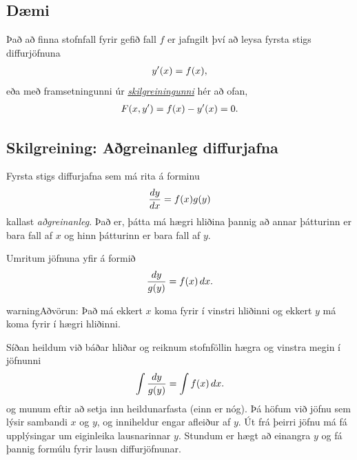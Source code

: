 \documentclass[a4paper,10pt,icelandic]{sphinxmanual}
\begin{document}
\subsection{Dæmi}
\label{kafli08:daemi}
Það að finna stofnfall fyrir gefið fall \(f\) er jafngilt því að leysa
fyrsta stigs diffurjöfnuna
\begin{gather}
\begin{split}y'(x) = f(x),\end{split}\notag
\end{gather}
eða með framsetningunni úr {\hyperref[kafli08:diffurjafna]{\emph{skilgreiningunni}}} hér
að ofan,
\begin{gather}
\begin{split}F(x,y') = f(x) - y'(x) = 0.\end{split}\notag
\end{gather}

\subsection{Skilgreining: Aðgreinanleg diffurjafna}
\label{kafli08:index-1}\label{kafli08:skilgreining-agreinanleg-diffurjafna}
Fyrsta stigs diffurjafna sem má rita á forminu
\begin{gather}
\begin{split}\frac{dy}{dx}=f(x)g(y)\end{split}\notag
\end{gather}
kallast \emph{aðgreinanleg}. Það er, þátta má hægri hliðina
þannig að annar þátturinn er bara fall af \(x\) og hinn þátturinn er
bara fall af \(y\).

Umritum jöfnuna yfir á formið
\begin{gather}
\begin{split}\frac{dy}{g(y)}=f(x)\,dx.\end{split}\notag
\end{gather}
\begin{notice}{warning}{Aðvörun:}
Það má ekkert \(x\) koma fyrir í vinstri hliðinni og
ekkert \(y\) má koma fyrir í hægri hliðinni.
\end{notice}

Síðan heildum við báðar hliðar og reiknum stofnföllin hægra og vinstra
megin í jöfnunni
\begin{gather}
\begin{split}\int\frac{dy}{g(y)}=\int f(x)\,dx.\end{split}\notag
\end{gather}
og munum eftir að setja inn heildunarfasta (einn er nóg). Þá höfum við
jöfnu sem lýsir sambandi \(x\) og \(y\), og inniheldur engar
afleiður af \(y\). Út frá þeirri jöfnu má fá upplýsingar um
eiginleika lausnarinnar \(y\). Stundum er hægt að einangra \(y\)
og fá þannig formúlu fyrir lausn diffurjöfnunar.
\end{document}
